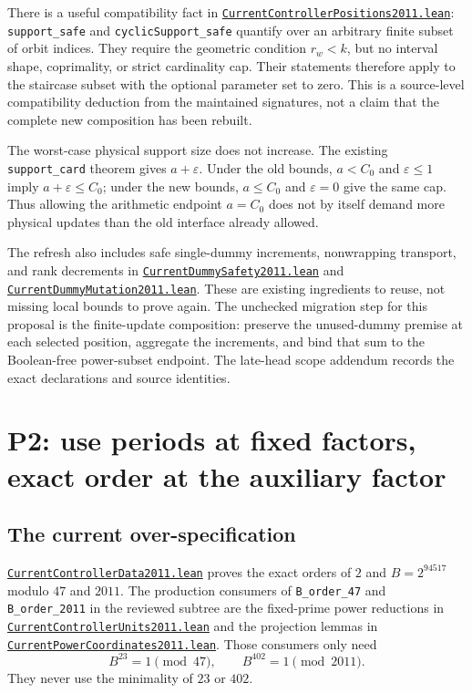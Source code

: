 \documentclass[11pt,letterpaper]{article}
\newcommand{\repobase}{https://github.com/VladimirReshetnikov/ProveIt/blob/9f35798db4a63c25e435fca14d75931144657d7e}
\newcommand{\refreshbase}{https://github.com/VladimirReshetnikov/ProveIt/blob/f00ba53b331833c6cb64707bd90e48489e5610f5}
\newcommand{\freshleanfile}[1]{\href{\refreshbase/Computability/DiophantineConsistency/Lean/DiophantineConsistency/#1.lean}{\nolinkurl{#1.lean}}}
\newcommand{\leanfile}[1]{\href{\repobase/Computability/DiophantineConsistency/Lean/DiophantineConsistency/#1.lean}{\nolinkurl{#1.lean}}}
\newcommand{\ident}[1]{\nolinkurl{#1}}
\begin{document}
There is a useful compatibility fact in
\freshleanfile{CurrentControllerPositions2011}:
\ident{support_safe} and \ident{cyclicSupport_safe} quantify over an
arbitrary finite subset of orbit indices. They require the geometric
condition $r_w<k$, but no interval shape, coprimality, or strict cardinality
cap. Their statements therefore apply to the staircase subset with the
optional parameter set to zero. This is a source-level compatibility
deduction from the maintained signatures, not a claim that the complete
new composition has been rebuilt.

The worst-case physical support size does not increase. The existing
\ident{support_card} theorem gives $a+\varepsilon$. Under the old bounds,
$a<C_0$ and $\varepsilon\le1$ imply $a+\varepsilon\le C_0$; under the
new bounds, $a\le C_0$ and $\varepsilon=0$ give the same cap. Thus allowing
the arithmetic endpoint $a=C_0$ does not by itself demand more physical
updates than the old interface already allowed.

The refresh also includes safe single-dummy increments, nonwrapping
transport, and rank decrements in \freshleanfile{CurrentDummySafety2011}
and \freshleanfile{CurrentDummyMutation2011}. These are existing ingredients
to reuse, not missing local bounds to prove again. The unchecked migration
step for this proposal is the finite-update composition: preserve the
unused-dummy premise at each selected position, aggregate the increments,
and bind that sum to the Boolean-free power-subset endpoint. The late-head
scope addendum records the exact declarations and source identities.

\section{P2: use periods at fixed factors, exact order at the auxiliary factor}

\subsection{The current over-specification}

\leanfile{CurrentControllerData2011} proves the exact orders of $2$ and
$B=2^{94517}$ modulo $47$ and $2011$. The production consumers of
\ident{B_order_47} and \ident{B_order_2011} in the reviewed subtree are
the fixed-prime power reductions in \leanfile{CurrentControllerUnits2011}
and the projection lemmas in \leanfile{CurrentPowerCoordinates2011}.
Those consumers only need
\[
 B^{23}=1\pmod{47},\qquad B^{402}=1\pmod{2011}.
\]
They never use the minimality of $23$ or $402$.
\end{document}
